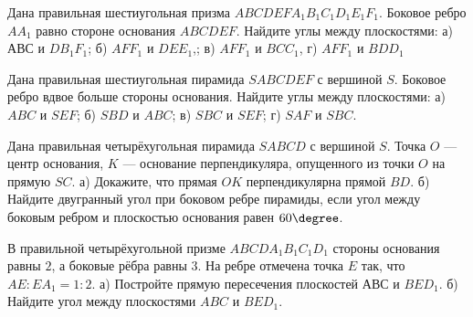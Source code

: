 \begin{homework}[number=2]
	\begin{listofex}
		\item Дана правильная шестиугольная призма \(ABCDEFA_1B_1C_1D_1E_1F_1\). Боковое ребро \(AA_1\) равно стороне основания \(ABCDEF\). Найдите углы между плоскостями: а) \(АВС\) и \(DB_1F_1\); б) \(AFF_1\) и \(DEE_1\),; в) \(AFF_1\) и \(BCC_1\), г) \(AFF_1\) и \(BDD_1\)
		\item Дана правильная шестиугольная пирамида \(SABCDEF\) с вершиной \(S\). Боковое ребро вдвое больше стороны основания. Найдите углы между плоскостями: а) \(ABC\) и \(SEF\); б) \(SBD\) и \(ABC\); в) \(SBC\) и \(SEF\); г) \(SAF\) и \(SBC\).
		\item Дана правильная четырёхугольная пирамида \(SABCD\) с вершиной \(S\). Точка \(O\) --- центр основания, \(K\) --- основание перпендикуляра, опущенного из точки \(O\) на прямую \(SC\). а) Докажите, что прямая \(OK\) перпендикулярна прямой \(BD\). б) Найдите двугранный угол при боковом ребре пирамиды, если угол между боковым ребром и плоскостью основания равен \(60 \degree \).
		\item В правильной четырёхугольной призме \(ABCDA_1B_1C_1D_1\) стороны основания равны \(2\), а боковые рёбра равны \(3\). На ребре отмечена точка \(E\) так, что \(AE:EA_1 = 1:2\). а) Постройте прямую пересечения плоскостей \(АВС\) и \(BED_1\). б) Найдите угол между плоскостями \(ABC\) и \(BED_1\).
	\end{listofex}
\end{homework}

